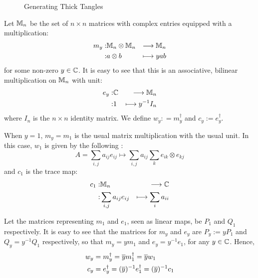 \documentclass[./Thick_TQFTs_and_Quantum_Information.tex]{subfiles}
\begin{document}
\begin{figure}[H]
\begin{center}
\caption{Generating Thick Tangles}
\end{center}
\end{figure}

Let $\mathbb{M}_n$ be the set of $n \times n$ matrices with complex entries equipped
with a multiplication:
\begin{eqnarray*}
  m_y :& \mathbb{M}_n \otimes \mathbb{M}_n &\stackrel{}{\longrightarrow}     \mathbb{M}_n \\
      :&  a   \otimes b    &\longmapsto yab
\end{eqnarray*}
for some non-zero $y \in \mathbb{C}$. It is easy to see that this is an associative,
bilinear multiplication on $\mathbb{M}_n$ with unit:
\begin{eqnarray*}
  e_y :& \mathbb{C} &\stackrel{}{\longrightarrow}     \mathbb{M}_n \\
    :&  1 &\longmapsto y^{-1}I_n
\end{eqnarray*}
where $I_n$ is the $n \times n$ identity matrix. We define
$w_y : = m_y^{\dagger}$ and $c _y := e_y^{\dagger}$.

When $y = 1$, $m_y = m_1$ is the usual matrix multiplication with the usual
unit. In this case, $w_1$ is given by the following \cite[8]{CatQChan}:
\[
  A = \sum_{i, j} a_{ij}e_{ij}
    \mapsto \sum_{i, j} a_{ij} \sum_{k} e_{ik} \otimes e_{kj}
\]
and $c_1$ is the trace map:
\begin{eqnarray*}
  c_1 :& \mathbb{M}_n &\stackrel{}{\longrightarrow}     \mathbb{C} \\
      :& \sum_{i, j} a_{ij}e_{ij} &\longmapsto \sum_{i} a_{ii}
\end{eqnarray*}

Let the matrices representing $m_1$ and $e_1$, seen as linear maps, be $P_1$ and
$Q_1$ respectively. It is easy to see that the matrices for $m_y$ and $e_y$ are
$P_y := yP_1$ and $Q_y = y^{-1}Q_1$ respectively, so that $m_y = ym_1$ and
$e_y = y^{-1}e_1$, for any $y \in \mathbb{C}$. Hence,
\begin{align*}
  w_y &= m_y^{\dagger} = \overline{y}m_1^{\dagger} = \overline{y}w_1 \\
  c_y &= e_y^{\dagger} = (\overline{y})^{-1}e_1^{\dagger} = (\overline{y})^{-1}c_1
\end{align*}
\end{document}
